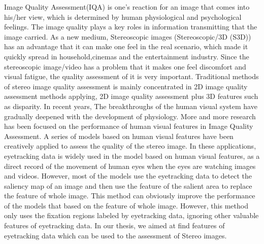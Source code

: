 \begin{englishabstract}

Image Quality Assessment(IQA) is one's reaction for an image that comes into his/her view, which is determined by human physiological and psychological feelings. The image quality plays a key roles in information transmitting that the image carried. As a new medium,  Stereoscopic images (Stereoscopic/3D (S3D)) has an advantage that it can make one feel in the real scenario, which made it quickly spread in household,cinemas and the entertainment industry. Since the stereoscopic image/video has a problem that it makes one feel discomfort and visual fatigue, the quality assessment of it is very important.  Traditional methods of stereo image quality assessment is mainly concentrated in 2D image quality assessment methods applying, 2D image quality assessment plus 3D features such as disparity. In recent years,  The breakthroughs of the human visual system have gradually deepened with the development of physiology. More and more research has been focused on the performance of human visual features in Image Quality Assessment. A series of models  based on human visual features have been creatively applied to assess the quality of the stereo image. In these applications,  eyetracking data is widely used in the model based on human visual features, as a direct record of the movement of human eyes when the eyes are watching images and videos. However, most of the models use the eyetracking data to detect the saliency map of an image and then use the feature of the salient area to replace the feature of whole image. This method can obviously improve the performance of the models that based on the feature of whole image. However, this method only uses the fixation regions labeled by eyetracking data, ignoring other valuable features of  eyetracking data. In our thesis, we aimed at find features of eyetracking data which can be used to the assessment of Stereo images.


\end{englishabstract}
